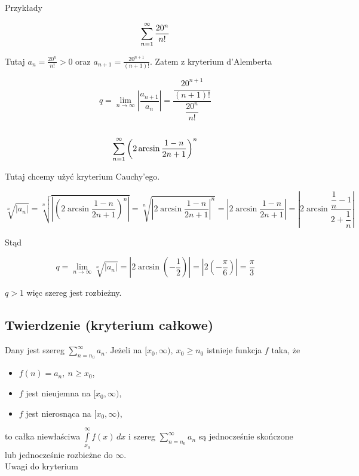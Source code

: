 Przykłady

$$ \sum\limits_{n = 1}^{\infty} \frac{20^n}{n!} $$

Tutaj $ a_n = \frac{20^n}{n!} > 0 $ oraz $ a_{n + 1} = \frac{20^{n + 1}}{(n + 1)!} $. Zatem z kryterium d'Alemberta

$$ q = \lim_{n \to \infty} \left| \frac{a_{n + 1}}{a_n} \right| = \frac{ \dfrac{20^{n + 1}}{(n+1)!} }{ \dfrac{20^n}{n!} } $$ \\

$$ \sum\limits_{n = 1}^{\infty} \left( 2\arcsin \frac{1 - n}{2n + 1} \right)^n $$

Tutaj chcemy użyć kryterium Cauchy'ego.

$$ \sqrt[n]{|a_n|} = \sqrt[n]{ \left| \left( 2\arcsin \frac{1-n}{2n+1} \right)^n \right| } 
= \sqrt[n]{ \left| 2\arcsin \frac{1-n}{2n+1} \right|^n } = \left| 2\arcsin \frac{1-n}{2n+1} \right|
= \left| 2\arcsin \frac{ \dfrac{1}{n} - 1  }{ 2 + \dfrac{1}{n} } \right| $$

Stąd 

$$ q = \lim_{n \to \infty} \sqrt[n]{|a_n|} = \left| 2\arcsin \left( -\frac{1}{2} \right) \right|
= \left| 2 \left( - \frac{\pi}{6} \right) \right| = \frac{\pi}{3} $$

$q > 1$ więc szereg jest rozbieżny.


\subsection*{Twierdzenie (kryterium całkowe)}

Dany jest szereg $ \sum\limits_{n = n_0}^{\infty} a_n $. Jeżeli na $ [x_0, \infty), \ x_0 \geq n_0 $ istnieje funkcja $f$
taka, że 

\begin{itemize}
    \item $ f(n) = a_n, \ n \geq x_0 $,\
    \item $f$ jest nieujemna na $[x_0, \infty)$,
    \item $f$ jest nierosnąca na $[x_0, \infty)$,
\end{itemize}

to całka niewłaściwa $ \int\limits_{x_0}^{\infty} f(x) \,dx $ i szereg $ \sum\limits_{n = n_0}^{\infty} a_n $ są
jednocześnie skończone lub jednocześnie rozbieżne do $\infty$. \\

Uwagi do kryterium

